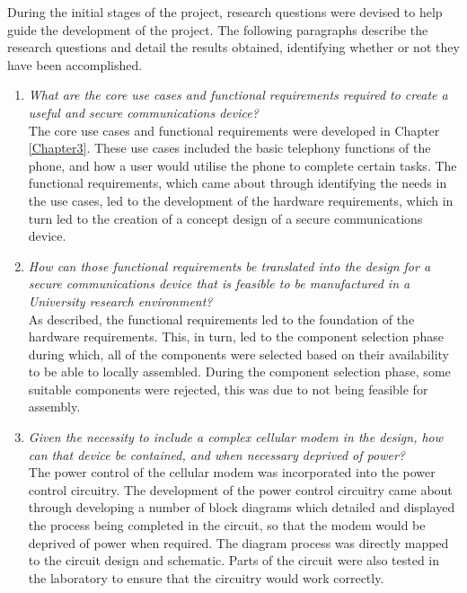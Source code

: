 During the initial stages of the project, research questions were devised to help guide the development of the project.
The following paragraphs describe the research questions and detail the results obtained, identifying whether or not they have been accomplished.\\

\begin{enumerate}
\item \textit{What are the core use cases and functional requirements required to create a useful and secure communications device?}\\

	The core use cases and functional requirements were developed in Chapter \ref{Chapter3}. 
These use cases included the basic telephony functions of the phone, and how a user would utilise the phone to complete certain tasks. 
The functional requirements, which came about through identifying the needs in the use cases, led to the development of the hardware requirements, which in turn led to the creation of a concept design of a secure communications device.\\

\item \textit{How can those functional requirements be translated into the design for a secure communications device that is feasible to be manufactured in a University research environment?}\\

	As described, the functional requirements led to the foundation of the hardware requirements. This, in turn, led to the component selection phase during which, all of the components were selected based on their availability to be able to locally assembled.
During the component selection phase, some suitable components were rejected, this was due to not being feasible for assembly.\\

\item \textit{Given the necessity to include a complex cellular modem in the design, how can that device be contained, and when necessary deprived of power?}\\

	The power control of the cellular modem was incorporated into the power control circuitry. 
The development of the power control circuitry came about through developing a number of block diagrams which detailed and displayed the process being completed in the circuit, so that the modem would be deprived of power when required. 
The diagram process was directly mapped to the circuit design and schematic. Parts of the circuit were also tested in the laboratory to ensure that the circuitry would work correctly. \\


\end{enumerate}

